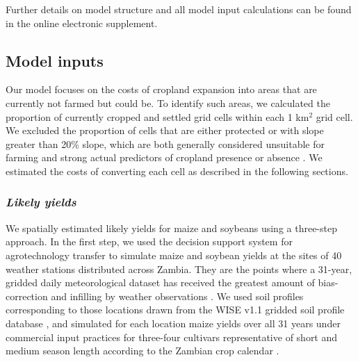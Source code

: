 \documentclass[a4paper]{article}
\begin{document}
{Further details on model structure and all model input calculations can be found in the online electronic supplement.  

\subsection*{Model inputs} 

Our model focuses on the costs of cropland expansion into areas that are currently not farmed but could be.  To identify such areas, we calculated the proportion of currently cropped and settled grid cells within each 1 km$^2$ grid cell.  We excluded the proportion of cells that are either protected or with slope greater than 20\% slope, which are both generally considered unsuitable for farming and strong actual predictors of cropland presence or absence \citep{estes_using_2014}.  We estimated the costs of converting each cell as described in the following sections.   

\subsubsection*{\emph{Likely yields}}

We spatially estimated likely yields for maize and soybeans using a three-step approach. In the first step, we used the decision support system for agrotechnology transfer \cite[DSSAT, ][]{jones_modelling_2003} to simulate maize and soybean yields at the sites of 40 weather stations distributed across Zambia. They are the points where a 31-year, gridded daily meteorological dataset has received the greatest amount of bias-correction and infilling by weather observations \citep{sheffield_development_2006,chaney_spatial_2014, estes_changing_2014}. We used soil profiles corresponding to those locations drawn from the WISE v1.1 gridded soil profile database \citep{harvestchoice_converting_2010}, and simulated for each location maize yields over all 31 years under commercial input practices for three-four cultivars representative of short and medium season length according to the Zambian crop calendar \citep{grassini_how_2015}.  

}
\end{document}
